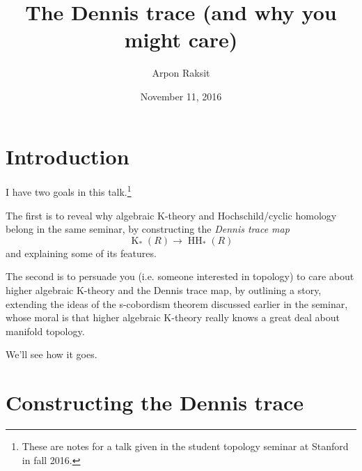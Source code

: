 

\title{The Dennis trace (and why you might care)}
\author{Arpon Raksit}
\date{November 11, 2016}


\maketitle

\addtocounter{section}{-1}

\newcommand{\A}{\operatorname{A}}
\newcommand{\ab}{\mathrm{ab}}
\newcommand{\Conc}{\operatorname{Conc}}
\newcommand{\GL}{\operatorname{GL}}
\newcommand{\hCob}{\operatorname{Cob_h}}
\newcommand{\HH}{\operatorname{HH}}
\newcommand{\Homeo}{\operatorname{Homeo}}
\newcommand{\K}{\operatorname{K}}
\newcommand{\Wh}{\operatorname{Wh}}


\section{Introduction}
\label{intro}

I have two goals in this talk.\footnote{These are notes for a talk given in the student topology seminar at Stanford in fall 2016.}

The first is to reveal why algebraic K-theory and Hochschild/cyclic homology belong in the same seminar, by constructing the \emph{Dennis trace map}
\[
\K_*(R) \to \HH_*(R)
\]
and explaining some of its features.

The second is to persuade you (i.e. someone interested in topology) to care about higher algebraic K-theory and the Dennis trace map, by outlining a story, extending the ideas of the s-cobordism theorem discussed earlier in the seminar, whose moral is that higher algebraic K-theory really knows a great deal about manifold topology.

We'll see how it goes.


\section{Constructing the Dennis trace}
\label{dennis}



